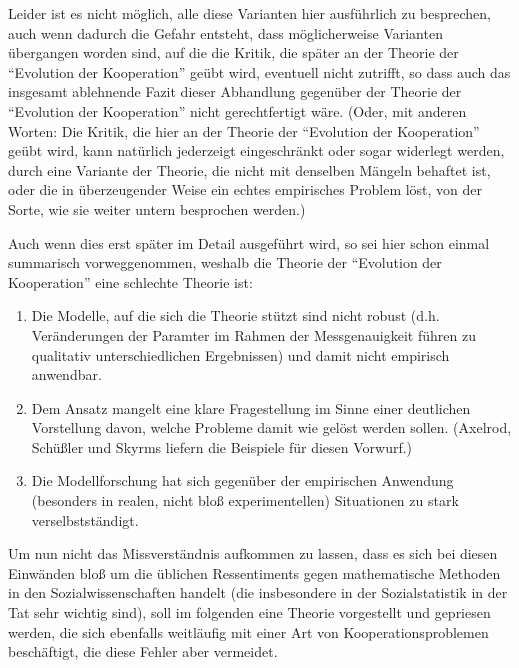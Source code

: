 \documentclass[12pt,a4paper,ngerman]{article}
\begin{document}
Leider ist es nicht möglich, alle diese Varianten hier ausführlich zu
besprechen, auch wenn dadurch die Gefahr entsteht, dass möglicherweise
Varianten übergangen worden sind, auf die die Kritik, die später an
der Theorie der "`Evolution der Kooperation"' geübt wird, eventuell
nicht zutrifft, so dass auch das insgesamt ablehnende Fazit dieser
Abhandlung gegenüber der Theorie der "`Evolution der Kooperation"'
nicht gerechtfertigt wäre. (Oder, mit anderen Worten: Die Kritik, die
hier an der Theorie der "`Evolution der Kooperation"' geübt wird,
kann natürlich jederzeigt eingeschränkt oder sogar widerlegt werden,
durch eine Variante der Theorie, die nicht mit denselben Mängeln
behaftet ist, oder die in überzeugender Weise ein echtes empirisches
Problem löst, von der Sorte, wie sie weiter untern besprochen werden.)

Auch wenn dies erst später im Detail ausgeführt wird, so sei hier
schon einmal summarisch vorweggenommen, weshalb die Theorie der
"`Evolution der Kooperation"' eine schlechte Theorie ist:

\begin{enumerate}

\item Die Modelle, auf die sich die Theorie stützt sind nicht robust (d.h.
Veränderungen der Paramter im Rahmen der Messgenauigkeit führen zu
qualitativ unterschiedlichen Ergebnissen) und damit nicht empirisch
anwendbar.

\item Dem Ansatz mangelt eine klare Fragestellung im Sinne einer deutlichen
Vorstellung davon, welche Probleme damit wie gelöst werden
sollen. (Axelrod, Schüßler und Skyrms liefern die Beispiele für
diesen Vorwurf.)

\item Die Modellforschung hat sich gegenüber der empirischen Anwendung 
(besonders in realen, nicht bloß experimentellen) Situationen zu stark
verselbstständigt.

\end{enumerate}

Um nun nicht das Missverständnis aufkommen zu lassen, dass es sich bei
diesen Einwänden bloß um die üblichen Ressentiments gegen
mathematische Methoden in den Sozialwissenschaften handelt (die
insbesondere in der Sozialstatistik in der Tat sehr wichtig sind),
soll im folgenden eine Theorie vorgestellt und gepriesen werden, die
sich ebenfalls weitläufig mit einer Art von Kooperationsproblemen
beschäftigt, die diese Fehler aber vermeidet.
\end{document}
